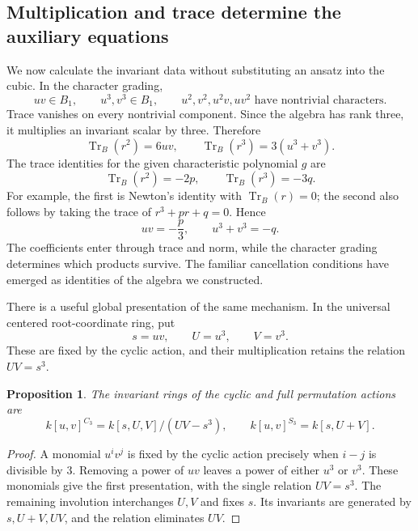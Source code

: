 \documentclass[11pt]{article}
\newtheorem{proposition}{Proposition}[section]
\theoremstyle{remark}
\begin{document}
\subsection{Multiplication and trace determine the auxiliary equations}

We now calculate the invariant data without substituting an ansatz into the cubic. In the character grading,
\[
uv\in B_1,\qquad u^3,v^3\in B_1,
\qquad u^2,v^2,u^2v,uv^2\text{ have nontrivial characters}.
\]
Trace vanishes on every nontrivial component. Since the algebra has rank three, it multiplies an invariant scalar by three. Therefore
\[
\operatorname{Tr}_{B}(r^2)=6uv,
\qquad
\operatorname{Tr}_{B}(r^3)=3(u^3+v^3).
\]
The trace identities for the given characteristic polynomial \(g\) are
\[
\operatorname{Tr}_{B}(r^2)=-2p,
\qquad
\operatorname{Tr}_{B}(r^3)=-3q.
\]
For example, the first is Newton's identity with \(\operatorname{Tr}_{B}(r)=0\); the second also follows by taking the trace of \(r^3+pr+q=0\). Hence
\begin{equation}
uv=-\frac p3,\qquad u^3+v^3=-q.
\label{eq:cardano-constraints}
\end{equation}
The coefficients enter through trace and norm, while the character grading determines which products survive. The familiar cancellation conditions have emerged as identities of the algebra we constructed.

There is a useful global presentation of the same mechanism. In the universal centered root-coordinate ring, put
\[
s=uv,\qquad U=u^3,\qquad V=v^3.
\]
These are fixed by the cyclic action, and their multiplication retains the relation \(UV=s^3\).

\begin{proposition}
The invariant rings of the cyclic and full permutation actions are
\begin{equation}
k[u,v]^{C_3}=k[s,U,V]/(UV-s^3),
\qquad
k[u,v]^{S_3}=k[s,U+V].
\label{eq:cubic-invariants}
\end{equation}
\end{proposition}

\begin{proof}
A monomial \(u^iv^j\) is fixed by the cyclic action precisely when \(i-j\) is divisible by \(3\). Removing a power of \(uv\) leaves a power of either \(u^3\) or \(v^3\). These monomials give the first presentation, with the single relation \(UV=s^3\). The remaining involution interchanges \(U,V\) and fixes \(s\). Its invariants are generated by \(s,U+V,UV\), and the relation eliminates \(UV\).
\end{proof}
\end{document}
